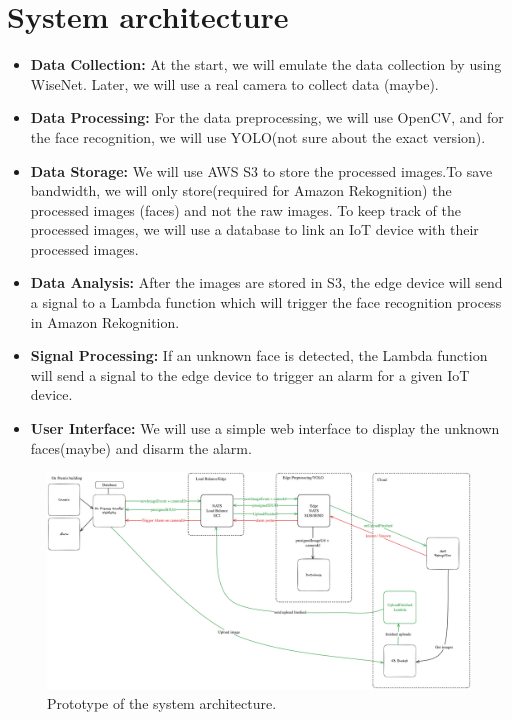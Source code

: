 \documentclass[conference]{IEEEtran}
\begin{document}
\section{System architecture}
\begin{itemize}
    \item \textbf{Data Collection:} At the start, we will emulate the data collection by using WiseNet. Later, we will use a real camera to collect data (maybe).
    \item \textbf{Data Processing:} For the data preprocessing, we will use OpenCV, and for the face recognition, we will use YOLO(not sure about the exact version).
    \item \textbf{Data Storage:} We will use AWS S3 to store the processed images.To save bandwidth, we will only store(required for Amazon Rekognition) the processed images (faces) 
                                    and not the raw images. To keep track of the processed images, we will use a database to link an IoT device with their processed images.
    \item \textbf{Data Analysis:} After the images are stored in S3, the edge device will send a signal to a Lambda function which will trigger the face recognition 
                                    process in Amazon Rekognition.
    \item \textbf{Signal Processing:} If an unknown face is detected, the Lambda function will send a signal to the edge device to trigger an alarm for a given IoT device.
    \item \textbf{User Interface:} We will use a simple web interface to display the unknown faces(maybe) and disarm the alarm.
\end{itemize}

\begin{figure}[h!]
    \centering
    \includegraphics[width=1\linewidth]{images/architecturev2.excalidraw.png}
    \caption{Prototype of the system architecture.}
    \label{fig:enter-label}
\end{figure}
\end{document}
